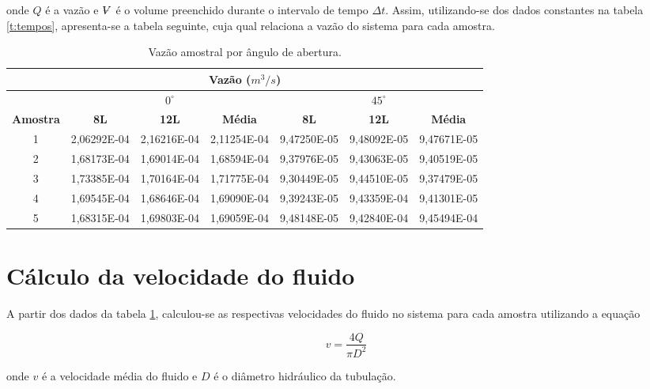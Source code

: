 onde $Q$ é a vazão e $\Vol$ é o volume preenchido durante o intervalo de tempo
$\Delta t$. Assim, utilizando-se dos dados constantes na tabela \ref{t:tempos},
apresenta-se a tabela seguinte, cuja qual relaciona a vazão do sistema para cada
amostra.

\begin{table}[H]
\centering
\caption{Vazão amostral por ângulo de abertura.}
\label{t:vazao}
\begin{tabular}{|c|c|c|c|c|c|c|}
\hline
\multicolumn{7}{|c|}{\textbf{Vazão ($m^3/s$)}}                                                               \\ \hline
\textbf{}        & \multicolumn{3}{c|}{\textbf{$0^\circ$}}     & \multicolumn{3}{c|}{\textbf{$45^\circ$}}    \\ \hline
\textbf{Amostra} & \textbf{8L} & \textbf{12L} & \textbf{Média} & \textbf{8L} & \textbf{12L} & \textbf{Média} \\ \hline
1                & 2,06292E-04 & 2,16216E-04  & 2,11254E-04    & 9,47250E-05 & 9,48092E-05  & 9,47671E-05    \\ \hline
2                & 1,68173E-04 & 1,69014E-04  & 1,68594E-04    & 9,37976E-05 & 9,43063E-05  & 9,40519E-05    \\ \hline
3                & 1,73385E-04 & 1,70164E-04  & 1,71775E-04    & 9,30449E-05 & 9,44510E-05  & 9,37479E-05    \\ \hline
4                & 1,69545E-04 & 1,68646E-04  & 1,69090E-04    & 9,39243E-05 & 9,43359E-04  & 9,41301E-05    \\ \hline
5                & 1,68315E-04 & 1,69803E-04  & 1,69059E-04    & 9,48148E-05 & 9,42840E-04  & 9,45494E-04    \\ \hline
\end{tabular}
\end{table}

\section{Cálculo da velocidade do fluido}
\label{sec:VelFluido}

A partir dos dados da tabela \ref{t:vazao}, calculou-se as respectivas
velocidades do fluido no sistema para cada amostra utilizando a equação

\begin{equation}
  v = \frac{4 Q}{\pi D^2}
\end{equation}

onde $v$ é a velocidade média do fluido e $D$ é o diâmetro hidráulico da
tubulação.

